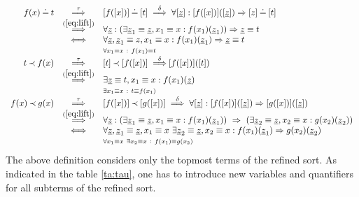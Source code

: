 \begin{equation}\label{eq:multtau}
\begin{array}{rcl}
f(x)\Eq t & \TTo{\tau} & [f([x])] \Eq [t] \ 
\TTo{\delta} \ \forall [\Ul z]:[f([x])]([\Ul z])\impl [z]\Eq [t] \\ & \TTo{\re{eq:lift}} & \forall \Ul z:
(\exists \Ul z_1\equiv \Ul z, x_1\equiv x: f(x_1)(\Ul z_1)) \impl \Ul z\equiv 
t\\
& \ifff & \forall \Ul z, \Ul z_1\equiv z, x_1\equiv x : 
f(x_1)(\Ul z_1) \impl \Ul z\equiv t \\
& & {\scriptstyle \forall x_1\equiv x\ :\ f(x_1)\equiv t} \\ t\Incl f(x) & \TTo{\tau} & [t]\Incl [f([x])] \ 
\TTo{\delta} [f([x])]([t]) \\
& \TTo{\re{eq:lift}} & \exists \Ul z\equiv t, x_1\equiv x: f(x_1)(\Ul z) \\ 
& & {\scriptstyle \exists x_1\equiv x\ :\ t\equiv f(x_1)} \\ f(x)\Incl g(x) & \TTo{\tau} & [f([x])]\Incl [g([x])] \ 
\TTo{\delta} \ \forall [\Ul z]:[f([x])]([\Ul z])\impl [g([x])]([\Ul z])\\ & \TTo{\re{eq:lift}} & \forall \Ul z :
(\exists \Ul z_1\equiv \Ul z, x_1\equiv x: f(x_1)(\Ul z_1))\ \impl\ 
(\exists \Ul z_2\equiv \Ul z, x_2\equiv x: g(x_2)(\Ul z_2)) \\ & \ifff & \forall \Ul z, \Ul z_1\equiv \Ul z, x_1\equiv x\ \exists \Ul z_2\equiv \Ul z, x_2\equiv x: f(x_1)(\Ul z_1)\impl g(x_2)(\Ul z_2)\\
& & {\scriptstyle \forall x_1\equiv x\ \exists x_2\equiv x\ :\ f(x_1)\equiv 
g(x_2)}
\end{array}
\end{equation}
The above definition considers only the topmost terms of the refined sort. As indicated in the table \ref{ta:tau}, one has to introduce new variables and quantifiers for all subterms of the refined sort. 

